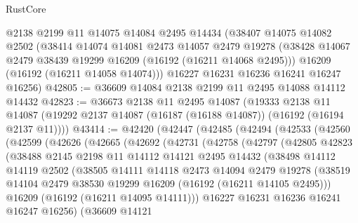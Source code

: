 \begin{lexlean}{RustCore}
\begin{coremodule}
    @2138
    @2199
    @11
    @14075
    @14084
    @2495
    @14434
    (@38407
      @14075
      @14082
      @2502
      (@38414
        @14074
        @14081
        @2473
        @14057
        @2479
        @19278
        (@38428 @14067 @2479 @38439 @19299 @16209 (@16192 (@16211 @14068 @2495)))
        @16209
        (@16192 (@16211 @14058 @14074)))
      @16227
      @16231
      @16236
      @16241
      @16247
      @16256)
@42805 := @36609 @14084 @2138 @2199 @11 @2495 @14088 @14112 @14432
@42823 := @36673
    @2138
    @11
    @2495
    @14087
    (@19333
      @2138
      @11
      @14087
      (@19292 @2137 @14087 (@16187 (@16188 @14087)) (@16192 (@16194 @2137 @11))))
@43414 := @42420
    (@42447
      (@42485
        (@42494
          (@42533
            (@42560
              (@42599
                (@42626
                  (@42665
                    (@42692
                      (@42731
                        (@42758
                          (@42797
                            (@42805
                              @42823
                              (@38488
                                @2145
                                @2198
                                @11
                                @14112
                                @14121
                                @2495
                                @14432
                                (@38498
                                  @14112
                                  @14119
                                  @2502
                                  (@38505
                                    @14111
                                    @14118
                                    @2473
                                    @14094
                                    @2479
                                    @19278
                                    (@38519
                                      @14104
                                      @2479
                                      @38530
                                      @19299
                                      @16209
                                      (@16192 (@16211 @14105 @2495)))
                                    @16209
                                    (@16192 (@16211 @14095 @14111)))
                                  @16227
                                  @16231
                                  @16236
                                  @16241
                                  @16247
                                  @16256)
                                (@36609
                                  @14121

\end{coremodule}
\end{lexlean}
